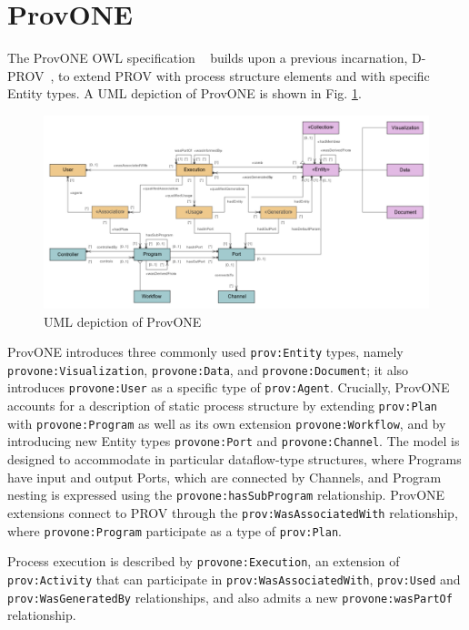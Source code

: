 \documentclass[a4paper]{llncs}
\begin{document}
\section{ProvONE}

The ProvONE OWL specification ~\cite{provone} builds upon a previous incarnation, D-PROV~\cite{Missier2013a}, to extend PROV with process structure elements and with specific Entity types. 
A UML depiction of ProvONE is shown in Fig. \ref{fig:provone-model}.

\begin{figure}
\centering
\includegraphics[width=\linewidth]{./provone-model}
\caption{UML depiction of ProvONE}
\label{fig:provone-model}
\end{figure}

\sloppy ProvONE introduces three  commonly used \texttt{prov:Entity} types, namely \texttt{provone:Visualization}, \texttt{provone:Data}, and \texttt{provone:Document}; it also introduces \texttt{provone:User} as a specific type of \texttt{prov:Agent}.
Crucially, ProvONE accounts for a description of static process structure by extending \texttt{prov:Plan} with \texttt{provone:Program} as well as its own extension \texttt{provone:Workflow}, and by introducing new Entity types \texttt{provone:Port} and \texttt{provone:Channel}.
The model is designed to accommodate in particular dataflow-type structures, where Programs have input and output Ports, which are connected by Channels, and Program nesting is expressed using the \texttt{provone:hasSubProgram} relationship.
ProvONE extensions connect to PROV through the \texttt{prov:WasAssociatedWith} relationship, where \texttt{provone:Program} participate as a type of \texttt{prov:Plan}. 

Process execution is described by \texttt{provone:Execution}, an extension of \texttt{prov:Activity} that can participate in \texttt{prov:WasAssociatedWith}, \texttt{prov:Used} and \texttt{prov:WasGeneratedBy} relationships, and also admits a new \texttt{provone:wasPartOf} relationship.
\end{document}
